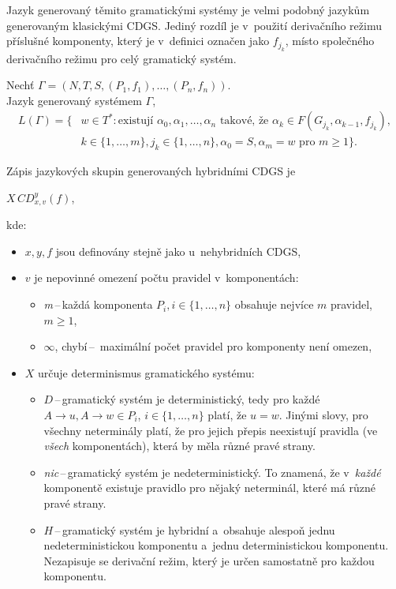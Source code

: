 Jazyk generovaný těmito gramatickými systémy je velmi podobný jazykům generovaným klasickými CDGS.
Jediný rozdíl je v~použití derivačního režimu příslušné komponenty, který je v~definici označen jako $f_{j_k}$, místo společného derivačního režimu pro celý gramatický systém.
\begin{definition}
    Nechť $\Gamma = (N, T, S, (P_1, f_1), \ldots, (P_n, f_n))$.\\
    Jazyk generovaný systémem $\Gamma$,
    \begin{align*}
        L(\Gamma) = \{&w \in T^*: \text{existují } \alpha_0, \alpha_1,\ldots, \alpha_n \text{ takové, že } \alpha_k \in F(G_{j_k}, \alpha_{k-1}, f_{j_k}),\\
        &k \in \{1, \ldots, m\}, j_k \in \{1, \ldots, n\}, \alpha_0 = S, \alpha_m = w \text{ pro } m \geq 1\}.
    \end{align*}
\end{definition}

Zápis jazykových skupin generovaných hybridními CDGS je
\begin{center}
    $X\,CD^y_{x, v}(f) $, 
\end{center}
kde:
\begin{itemize}
    \item $x, y, f$ jsou definovány stejně jako u~nehybridních CDGS,
    \item $v$ je nepovinné omezení počtu pravidel v~komponentách:
    \begin{itemize}[label=$\circ$]
        \item \emph{m}\,--\,každá komponenta $P_i, i \in \{1, \ldots, n\}$ obsahuje nejvíce $m$ pravidel, $m \geq 1$,
        \item $\infty$, chybí\,--\, maximální počet pravidel pro komponenty není omezen,
    \end{itemize}
    \item $X$ určuje determinismus gramatického systému:
    \begin{itemize}[label=$\circ$]
        \item $D$\,--\,gramatický systém je deterministický, tedy pro každé $A \rightarrow u, A \rightarrow w \in P_i$, $i \in \{1, \ldots, n\}$ platí, že $u = w$.
        Jinými slovy, pro všechny neterminály platí, že pro jejich přepis neexistují pravidla (ve \emph{všech} komponentách), která by měla různé pravé strany.
        \item \emph{nic}\,--\,gramatický systém je nedeterministický.
        To znamená, že v~\emph{každé} komponentě existuje pravidlo pro nějaký neterminál, které má různé pravé strany.
        \item $H$\,--\,gramatický systém je hybridní a~obsahuje alespoň jednu nedeterministickou komponentu a~jednu deterministickou komponentu.
        Nezapisuje se derivační režim, který je určen samostatně pro každou komponentu. 
    \end{itemize}
\end{itemize}


